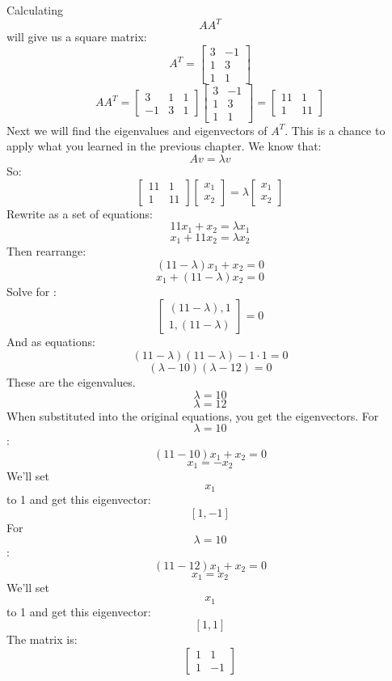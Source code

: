 Calculating $$AA^T$$ will give us a square matrix:
$$ A^T = \begin{bmatrix}
3 & -1\\
1 & 3 \\
1 & 1 
\end{bmatrix}$$
$$AA^T = \begin{bmatrix}
3 & 1 & 1\\
 -1 & 3 & 1
\end{bmatrix}
\begin{bmatrix}
3 & -1\\
1 & 3\\
1 & 1
\end{bmatrix}
= \begin{bmatrix}
11 & 1\\
 1 & 11 
\end{bmatrix}
$$
Next we will find the eigenvalues and eigenvectors of $A^T$. This is a chance to apply what you learned in the previous chapter. We know that:
\begin{equation}
Av = \lambda v
\end{equation}
So:
$$
\begin{bmatrix}
11 & 1 \\
 1 & 11  
\end{bmatrix}
\begin{bmatrix}
x_1  \\
x_2 
\end{bmatrix}
=
\lambda 
\begin{bmatrix}
x_1   \\
x_2 
\end{bmatrix}
$$
Rewrite as a set of equations:
$$11x_1 + x_2 = \lambda x_1$$
$$x_1 + 11x_2 = \lambda x_2$$
Then rearrange:
$$(11−\lambda )x_1 +x_2 =0$$
$$x_1 +(11−\lambda )x_2 =0 $$
Solve for \lambda :
$$\begin{bmatrix}
(11 -\lambda), 1 \\
 1, (11 -\lambda) 
\end{bmatrix} = 0$$
And as equations:
$$(11 − \lambda)(11 − \lambda) − 1 · 1 = 0$$
$$(\lambda − 10)(\lambda − 12) = 0$$
These are the eigenvalues.
$$\lambda = 10$$
$$\lambda = 12$$
When substituted into the original equations, you get the eigenvectors. For $$ \lambda = 10$$:
$$(11−10)x_1 +x_2 =0 $$
$$x_1 = -x_2$$
We'll set $$x_1$$ to 1 and get this eigenvector:
$$\left[ 1,-1 \right]$$
For $$ \lambda = 10$$:
$$(11−12)x_1 +x_2 =0  $$
$$x_1 = x_2 $$
We'll set $$x_1$$ to 1 and get this eigenvector:
$$\left[ 1,1 \right]$$
The matrix is:
$$
\begin{bmatrix}
1 & 1 \\
1 & -1 
\end{bmatrix}
$$
